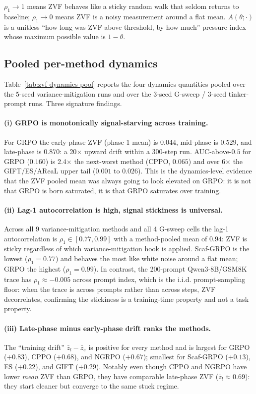 $\rho_1 \to 1$ means ZVF behaves like a sticky random walk that
seldom returns to baseline; $\rho_1 \to 0$ means ZVF is a noisy
measurement around a flat mean. $A(\theta;\cdot)$ is a unitless
``how long was ZVF above threshold, by how much'' pressure index
whose maximum possible value is $1-\theta$.

\subsection{Pooled per-method dynamics}

Table~\ref{tab:zvf-dynamics-pool} reports the four dynamics quantities
pooled over the 5-seed variance-mitigation runs and over the 3-seed
G-sweep / 3-seed tinker-prompt runs. Three signature findings.

\paragraph{(i) GRPO is monotonically signal-starving across training.}
For GRPO the early-phase ZVF (phase 1 mean) is $0.044$, mid-phase is
$0.529$, and late-phase is $0.870$: a 20$\times$ upward drift within
a 300-step run. AUC-above-$0.5$ for GRPO ($0.160$) is 2.4$\times$ the
next-worst method (CPPO, $0.065$) and over 6$\times$ the GIFT/ES/AReaL
upper tail ($0.001$ to $0.026$). This is the dynamics-level evidence
that the ZVF pooled mean was always going to look elevated on GRPO: it
is not that GRPO is born saturated, it is that GRPO saturates over
training.

\paragraph{(ii) Lag-1 autocorrelation is high, signal stickiness is universal.}
Across all 9 variance-mitigation methods and all 4 G-sweep cells the
lag-1 autocorrelation is $\rho_1 \in [0.77, 0.99]$ with a method-pooled
mean of $0.94$: ZVF is sticky regardless of which variance-mitigation
hook is applied. Scaf-GRPO is the lowest ($\rho_1 = 0.77$) and behaves
the most like white noise around a flat mean; GRPO the highest
($\rho_1 = 0.99$). In contrast, the 200-prompt Qwen3-8B/GSM8K trace
has $\rho_1 \approx -0.005$ across prompt index, which is the i.i.d.
prompt-sampling floor: when the trace is across prompts rather than
across steps, ZVF decorrelates, confirming the stickiness is a
training-time property and not a task property.

\paragraph{(iii) Late-phase minus early-phase drift ranks the methods.}
The ``training drift'' $\bar z_l - \bar z_e$ is positive for every
method and is largest for GRPO ($+0.83$), CPPO ($+0.68$), and
NGRPO ($+0.67$); smallest for Scaf-GRPO ($+0.13$), ES ($+0.22$), and
GIFT ($+0.29$). Notably even though CPPO and NGRPO have lower
\emph{mean} ZVF than GRPO, they have comparable late-phase ZVF
($\bar z_l \approx 0.69$): they start cleaner but converge to the
same stuck regime.

